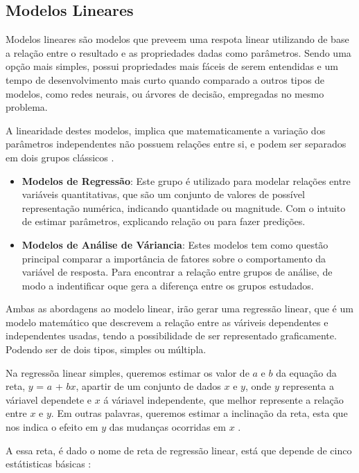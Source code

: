 \documentclass[
	12pt,				%
	openright,			%
	oneside,			%
	a4paper,			%
	english,			%
	brazil				%
	]{abntex2}
\begin{document}

\subsection{Modelos Lineares}

Modelos lineares são modelos que preveem uma respota linear utilizando de base a relação entre o resultado
e as propriedades dadas como parâmetros. Sendo uma opção mais simples, possui propriedades mais fáceis de
serem entendidas e um tempo de desenvolvimento mais curto quando comparado a outros tipos de modelos,
como redes neurais, ou árvores de decisão, empregadas no mesmo problema. \cite{modelos_lineares}

A linearidade destes modelos, implica que matematicamente a variação dos parâmetros independentes não
possuem relações entre si, e podem ser separados em dois grupos clássicos \cite{tipos_modelos_lineares}.
\begin{itemize}
	\item \textbf{Modelos de Regressão}:
	Este grupo é utilizado para modelar relações entre variáveis quantitativas, que são um conjunto de
	valores de possível representação numérica, indicando quantidade ou magnitude. Com o intuito de estimar
	parâmetros, explicando relação ou para fazer predições.
	\item \textbf{Modelos de Análise de Váriancia}:
	Estes modelos tem como questão principal comparar a importância de fatores sobre o comportamento da
	variável de resposta. Para encontrar a relação entre grupos de análise, de modo a indentificar oque
	gera a diferença entre os grupos estudados.
\end{itemize}

Ambas as abordagens ao modelo linear, irão gerar uma regressão linear, que é um modelo matemático que 
descrevem a relação entre as váriveis dependentes e independentes usadas, tendo a possibilidade de ser
representado graficamente. Podendo ser de dois tipos, simples ou múltipla.

Na regressõa linear simples, queremos estimar os valor de $a$ e $b$ da equação da reta, $y$ = $a$ + $bx$, 
apartir de um conjunto de dados $x$ e $y$, onde $y$ representa a váriavel dependete e $x$ á váriavel 
independente, que melhor represente a relação entre $x$ e $y$. Em outras palavras, queremos estimar a 
inclinação da reta, esta que nos indica o efeito em $y$ das mudanças ocorridas em $x$ 
\cite{modelos_regressao_linear}.

A essa reta, é dado o nome de reta de regressão linear, está que depende de cinco estátisticas básicas
\cite{modelos_regressao_linear}:
\end{document}
